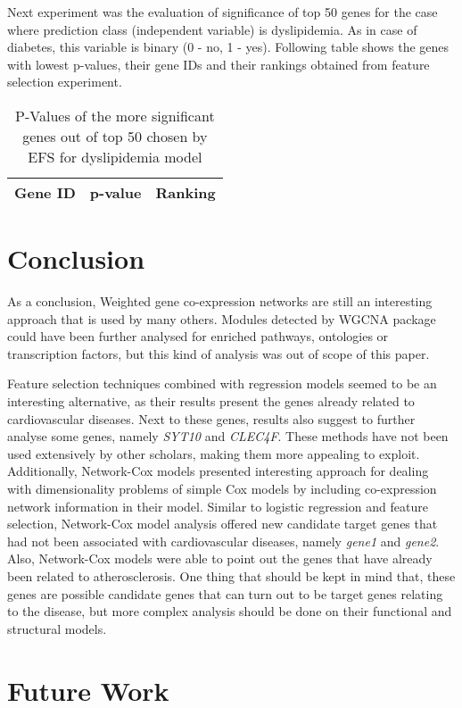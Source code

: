 \documentclass{ba-kecs}
\numberwithin{figure}{section}
\numberwithin{equation}{section}
\begin{document}
Next experiment was the evaluation of significance of top 50 genes for the case where prediction class (independent variable) is dyslipidemia. As in case of diabetes, this variable is binary (0 - no, 1 - yes). Following table shows the genes with lowest p-values, their gene IDs and their rankings obtained from feature selection experiment.
\begin{table}
\centering
\begin{tabular}{|l|l|l|}
Gene ID & p-value & Ranking \\ \hline
\hline
\end{tabular}
\caption{P-Values of the more significant genes out of top 50 chosen by EFS for dyslipidemia model}
\end{table}

\section{Conclusion}

As a conclusion, Weighted gene co-expression networks are still an interesting approach that is used by many others. Modules detected by WGCNA package could have been further analysed for enriched pathways, ontologies or transcription factors, but this kind of analysis was out of scope of this paper.

Feature selection techniques combined with regression models seemed to be an interesting alternative, as their results present the genes already related to cardiovascular diseases. Next to these genes, results also suggest to further analyse some genes, namely \textit{SYT10} and \textit{CLEC4F}. These methods have not been used extensively by other scholars, making them more appealing to exploit. Additionally, Network-Cox models presented interesting approach for dealing with dimensionality problems of simple Cox models by including co-expression network information in their model. Similar to logistic regression and feature selection, Network-Cox model analysis offered new candidate target genes that had not been associated with cardiovascular diseases, namely \textit{gene1} and \textit{gene2}. Also, Network-Cox models were able to point out the genes that have already been related to atherosclerosis. One thing that should be kept in mind that, these genes are possible candidate genes that can turn out to be target genes relating to the disease, but more complex analysis should be done on their functional and structural models.

\section{Future Work}
\end{document}
